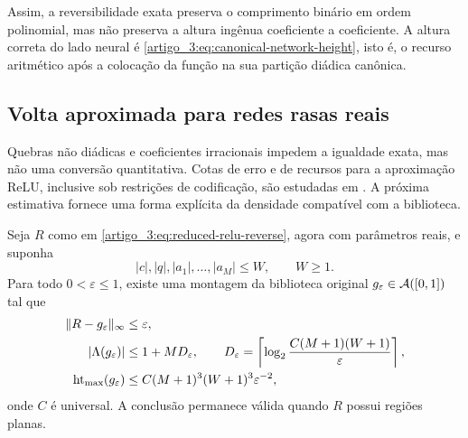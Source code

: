 Assim, a reversibilidade exata preserva o comprimento binário em ordem
polinomial, mas não preserva a altura ingênua coeficiente a coeficiente. A
altura correta do lado neural é \eqref{artigo_3:eq:canonical-network-height}, isto é,
o recurso aritmético após a colocação da função na sua partição diádica
canônica.

\subsection{Volta aproximada para redes rasas reais}

Quebras não diádicas e coeficientes irracionais impedem a igualdade exata, mas
não uma conversão quantitativa. Cotas de erro e de recursos para a aproximação
ReLU, inclusive sob restrições de codificação, são estudadas em
\citet{artigo_1-yarotsky2017,artigo_1-bolcskei2019}. A próxima estimativa fornece uma forma explícita
da densidade compatível com a biblioteca.

\begin{theorem}\label{map:artigo_3:5.5}
\label{artigo_3:thm:quantized-approximate-reverse}
Seja $R$ como em \eqref{artigo_3:eq:reduced-relu-reverse}, agora com parâmetros reais,
e suponha
\begin{equation}
 |c|,|q|,|a_1|,\ldots,|a_M|\le W,
 \qquad W\ge1.
 \label{artigo_3:eq:real-network-weight-bound}
\end{equation}
Para todo $0<\varepsilon\le1$, existe uma montagem da biblioteca original
$g_\varepsilon\in\mathcal{A}([0,1])$ tal que
\begin{align}
 \|R-g_\varepsilon\|_\infty&\le\varepsilon,
 \label{artigo_3:eq:approximate-reverse-error}\\
 |\Lambda(g_\varepsilon)|&\le1+MD_\varepsilon,
 \qquad
 D_\varepsilon=
 \left\lceil\log_2\frac{C(M+1)(W+1)}{\varepsilon}\right\rceil,
 \label{artigo_3:eq:approximate-reverse-leaves}\\
 \operatorname{ht}_{\max}(g_\varepsilon)
 &\le
 C(M+1)^3(W+1)^3\varepsilon^{-2},
 \label{artigo_3:eq:approximate-reverse-height}
\end{align}
onde $C$ é universal. A conclusão permanece válida quando $R$ possui regiões
planas.
\end{theorem}

